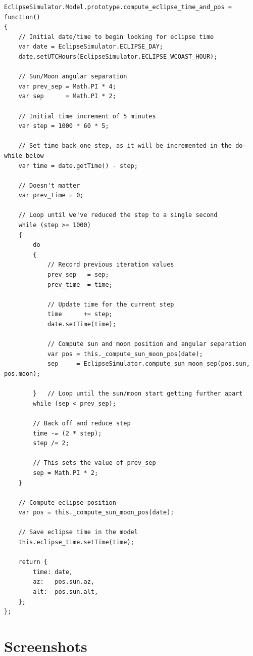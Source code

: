 \documentclass[10pt, onecolumn, draftclsnofoot, letterpaper, compsoc]{IEEEtran}
\begin{document}
\begin{verbatim}
EclipseSimulator.Model.prototype.compute_eclipse_time_and_pos = function()
{
    // Initial date/time to begin looking for eclipse time
    var date = EclipseSimulator.ECLIPSE_DAY;
    date.setUTCHours(EclipseSimulator.ECLIPSE_WCOAST_HOUR);

    // Sun/Moon angular separation
    var prev_sep = Math.PI * 4;
    var sep      = Math.PI * 2;

    // Initial time increment of 5 minutes
    var step = 1000 * 60 * 5;

    // Set time back one step, as it will be incremented in the do-while below
    var time = date.getTime() - step;

    // Doesn't matter
    var prev_time = 0;

    // Loop until we've reduced the step to a single second
    while (step >= 1000)
    {
        do
        {
            // Record previous iteration values
            prev_sep   = sep;
            prev_time  = time;

            // Update time for the current step
            time      += step;
            date.setTime(time);

            // Compute sun and moon position and angular separation
            var pos = this._compute_sun_moon_pos(date);
            sep     = EclipseSimulator.compute_sun_moon_sep(pos.sun, pos.moon);

        }	// Loop until the sun/moon start getting further apart
        while (sep < prev_sep);

        // Back off and reduce step
        time -= (2 * step);
        step /= 2;

        // This sets the value of prev_sep
        sep = Math.PI * 2;
    }

    // Compute eclipse position
    var pos = this._compute_sun_moon_pos(date);

    // Save eclipse time in the model
    this.eclipse_time.setTime(time);

    return {
        time: date,
        az:   pos.sun.az,
        alt:  pos.sun.alt,
    };
};
\end{verbatim}

\section{Screenshots}
\end{document}
